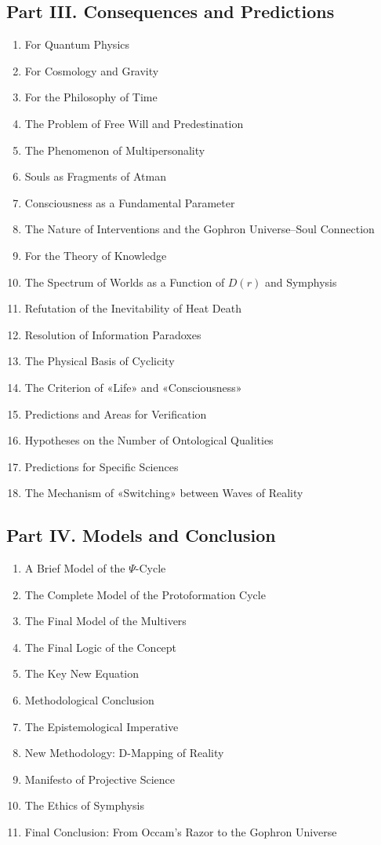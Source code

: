 \documentclass[a4paper,12pt]{article}
\begin{document}
	\subsection*{Part III. Consequences and Predictions}
	\begin{enumerate}[label=3.\arabic*.]
		\item For Quantum Physics
		\item For Cosmology and Gravity
		\item For the Philosophy of Time
		\item The Problem of Free Will and Predestination
		\item The Phenomenon of Multipersonality
		\item Souls as Fragments of Atman
		\item Consciousness as a Fundamental Parameter
		\item The Nature of Interventions and the Gophron Universe--Soul Connection
		\item For the Theory of Knowledge
		\item The Spectrum of Worlds as a Function of $D(r)$ and Symphysis
		\item Refutation of the Inevitability of Heat Death
		\item Resolution of Information Paradoxes
		\item The Physical Basis of Cyclicity
		\item The Criterion of «Life» and «Consciousness»
		\item Predictions and Areas for Verification
		\item Hypotheses on the Number of Ontological Qualities
		\item Predictions for Specific Sciences
		\item The Mechanism of «Switching» between Waves of Reality
	\end{enumerate}
	
	\subsection*{Part IV. Models and Conclusion}
	\begin{enumerate}[label=4.\arabic*.]
		\item A Brief Model of the $\Psi$-Cycle
		\item The Complete Model of the Protoformation Cycle
		\item The Final Model of the Multivers
		\item The Final Logic of the Concept
		\item The Key New Equation
		\item Methodological Conclusion
		\item The Epistemological Imperative
		\item New Methodology: D-Mapping of Reality
		\item Manifesto of Projective Science
		\item The Ethics of Symphysis
		\item Final Conclusion: From Occam's Razor to the Gophron Universe
	\end{enumerate}
	
\end{document}
